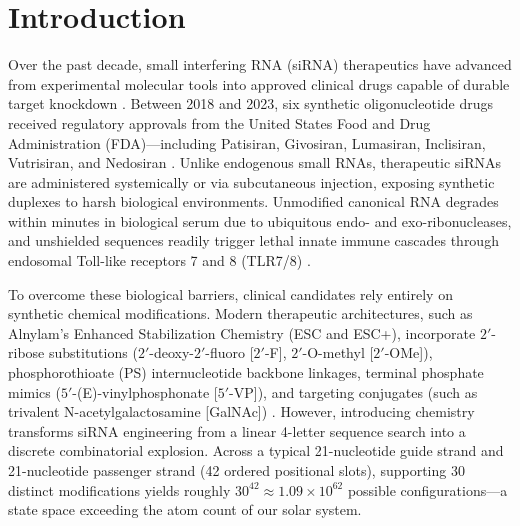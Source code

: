 \documentclass[twocolumn]{article}
\begin{document}
\section{Introduction}

Over the past decade, small interfering RNA (siRNA) therapeutics have advanced from experimental molecular tools into approved clinical drugs capable of durable target knockdown \cite{khvorova2017modern}. Between 2018 and 2023, six synthetic oligonucleotide drugs received regulatory approvals from the United States Food and Drug Administration (FDA)---including Patisiran, Givosiran, Lumasiran, Inclisiran, Vutrisiran, and Nedosiran \cite{chen2026oligonucleotide,davis2025nar}. Unlike endogenous small RNAs, therapeutic siRNAs are administered systemically or via subcutaneous injection, exposing synthetic duplexes to harsh biological environments. Unmodified canonical RNA degrades within minutes in biological serum due to ubiquitous endo- and exo-ribonucleases, and unshielded sequences readily trigger lethal innate immune cascades through endosomal Toll-like receptors 7 and 8 (TLR7/8) \cite{sakamuri2020serum,chernolovskaya2010chemical}.

To overcome these biological barriers, clinical candidates rely entirely on synthetic chemical modifications. Modern therapeutic architectures, such as Alnylam's Enhanced Stabilization Chemistry (ESC and ESC+), incorporate $2'$-ribose substitutions ($2'$-deoxy-$2'$-fluoro [$2'$-F], $2'$-O-methyl [$2'$-OMe]), phosphorothioate (PS) internucleotide backbone linkages, terminal phosphate mimics ($5'$-(E)-vinylphosphonate [$5'$-VP]), and targeting conjugates (such as trivalent N-acetylgalactosamine [GalNAc]) \cite{khvorova2017modern,janas2018selection}. However, introducing chemistry transforms siRNA engineering from a linear 4-letter sequence search into a discrete combinatorial explosion. Across a typical 21-nucleotide guide strand and 21-nucleotide passenger strand (42 ordered positional slots), supporting 30 distinct modifications yields roughly $30^{42} \approx 1.09 \times 10^{62}$ possible configurations---a state space exceeding the atom count of our solar system.
\end{document}
